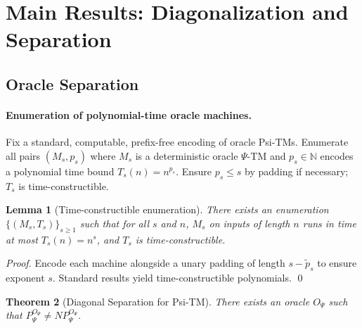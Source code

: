 \documentclass[11pt]{article}
\newtheorem{theorem}{Theorem}[section]
\newtheorem{lemma}[theorem]{Lemma}
\theoremstyle{plain}
\theoremstyle{definition}
\newcommand{\PSi}{\Psi}
\begin{document}
\section{Main Results: Diagonalization and Separation}

\subsection{Oracle Separation}

\paragraph{Enumeration of polynomial-time oracle machines.}
Fix a standard, computable, prefix-free encoding of oracle Psi-TMs. Enumerate all pairs $(M_s, p_s)$ where $M_s$ is a deterministic oracle $\PSi$-TM and $p_s\in\mathbb{N}$ encodes a polynomial time bound $T_s(n)=n^{p_s}$. Ensure $p_s\le s$ by padding if necessary; $T_s$ is time-constructible.

\begin{lemma}[Time-constructible enumeration]
\label{lem:enum}
There exists an enumeration $\{(M_s,T_s)\}_{s\ge1}$ such that for all $s$ and $n$, $M_s$ on inputs of length $n$ runs in time at most $T_s(n)=n^{s}$, and $T_s$ is time-constructible.
\end{lemma}
\begin{proof}
Encode each machine alongside a unary padding of length $s-\tilde p_s$ to ensure exponent $s$. Standard results yield time-constructible polynomials. \qed
\end{proof}

\begin{theorem}[Diagonal Separation for Psi-TM]
\label{thm:diagonal}
There exists an oracle $O_\PSi$ such that $P^{O_\PSi}_\PSi \neq NP^{O_\PSi}_\PSi$.
\end{theorem}
\end{document}
